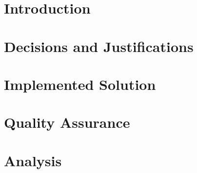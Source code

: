 \documentclass[11pt,a4paper]{book}
\begin{document}
\newtheorem{defn}{Definition}

\setlength{\parindent}{0pt}

\sloppy

\frontmatter



\tableofcontents

\setlength{\parskip}{6pt}






\mainmatter
\part{Introduction}










\part{Decisions and Justifications}






\part{Implemented Solution}










\part{Quality Assurance}




\part{Analysis}




\end{document}
